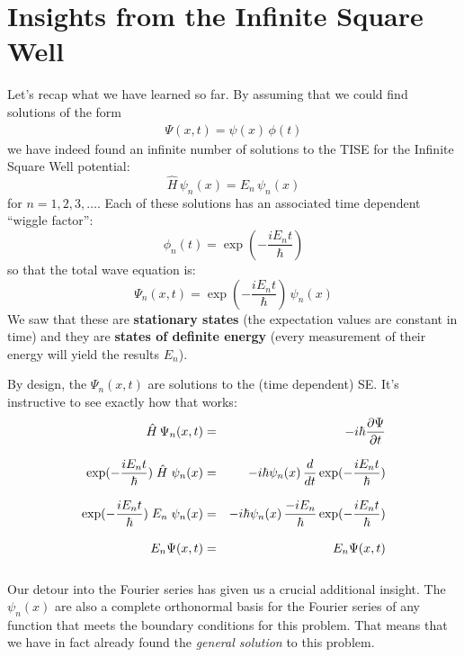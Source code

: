 \documentclass[12pt]{book}
\begin{document}
\section{Insights from the Infinite Square Well}

Let's recap what we have learned so far.  By assuming that we could find solutions of the form
\begin{eqnarray*}
\Psi(x,t) = \psi(x) \, \phi(t)
\end{eqnarray*}
we have indeed found an infinite number of solutions to the TISE for the Infinite Square Well potential:
\begin{equation*}
\hat{H} \, \psi_n(x) = E_n \, \psi_n(x)
\end{equation*}
for $n=1,2,3,\dots$. Each of these solutions has an associated time dependent ``wiggle factor'':
\begin{equation*}
\phi_n(t) = \exp(-\frac{i E_n t}{\hbar})
\end{equation*}
so that the total wave equation is:
\begin{equation*}
\Psi_n(x,t) = \exp(-\frac{i E_n t}{\hbar}) \, \psi_n(x)
\end{equation*}
We saw that these are {\bf stationary states} (the expectation values are constant in time) and they are {\bf states of definite energy} (every measurement of their energy will yield the results $E_n$).

By design, the $\Psi_n(x,t)$ are solutions to the (time dependent) SE.  It's instructive to see exactly how that works:
\begin{eqnarray*}
\hat{H} \, \Psi_n(x,t) &=& -i \hbar \frac{\partial\Psi}{\partial t}\\[8pt]
\exp(-\frac{i E_n t}{\hbar}) \; \hat{H} \; \psi_n(x) &=& -i \hbar \psi_n(x) \, \frac{d}{dt}
\exp(-\frac{i E_n t}{\hbar})\\[8pt]
\exp(-\frac{i E_n t}{\hbar}) \; E_n \; \psi_n(x) &=& -i \hbar \psi_n(x) \, \frac{-iE_n}{\hbar}
\exp(-\frac{i E_n t}{\hbar})\\[8pt]
E_n \Psi(x,t) &=& E_n \Psi(x,t)\\[8pt]
\end{eqnarray*}

Our detour into the Fourier series has given us a crucial additional insight.  The $\psi_n(x)$ are also a complete orthonormal basis for the Fourier series of any function that meets the boundary conditions for this problem.  That means that we have in fact already found the {\em general solution} to this problem.
\end{document}
